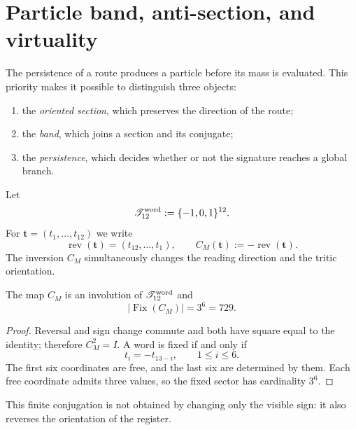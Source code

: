 \chapter{Particle band, anti-section, and virtuality}
\label{chap:banda-particula-virtual}

The persistence of a route produces a particle before its
mass is evaluated. This priority makes it possible to distinguish three objects:

\begin{enumerate}
\item the \emph{oriented section}, which preserves the direction of the route;
\item the \emph{band}, which joins a section and its conjugate;
\item the \emph{persistence}, which decides whether or not the signature reaches a
global branch.
\end{enumerate}

\begin{definition}
\label{def:palabras-cm}
Let
\[
 \mathscr T_{12}^{\rm word}:=\{-1,0,1\}^{12}.
\]
For \(\mathbf t=(t_1,\ldots,t_{12})\) we write
\[
 \operatorname{rev}(\mathbf t)
 =(t_{12},\ldots,t_1),
 \qquad
 C_M(\mathbf t):=-\operatorname{rev}(\mathbf t).
\]
The inversion \(C_M\) simultaneously changes the reading direction and the
tritic orientation.
\end{definition}

\begin{theorem}
\label{thm:involucion-cm-censo}
The map \(C_M\) is an involution of
\(\mathscr T_{12}^{\rm word}\) and
\[
 \left|\operatorname{Fix}(C_M)\right|=3^6=729.
\]
\end{theorem}

\begin{proof}
Reversal and sign change commute and both have square equal to
the identity; therefore \(C_M^2=I\). A word is fixed if and only if
\[
 t_i=-t_{13-i},\qquad 1\leq i\leq6.
\]
The first six coordinates are free, and the last six are
determined by them. Each free coordinate admits three values, so
the fixed sector has cardinality \(3^6\).
\end{proof}

This finite conjugation is not obtained by changing only the visible sign:
it also reverses the orientation of the register.

